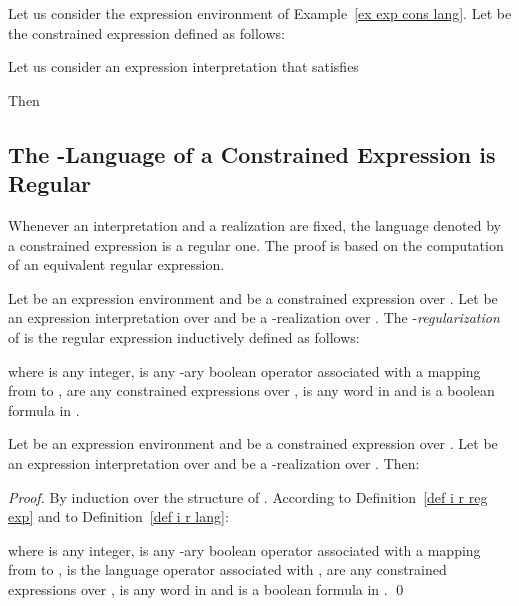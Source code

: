 \documentclass[a4paper]{llncs}
\begin{document}
    \begin{example}\label{ex anbncn}
      Let us consider the expression environment  of Example~\ref{ex exp cons lang}.
      Let  be the constrained expression defined as follows:
      
      Let us consider an expression interpretation  that satisfies
      
      Then
      
    \end{example}

  \subsection{The -Language of a Constrained Expression is Regular}
  
  Whenever an interpretation and a realization are fixed, the language denoted by a constrained expression is a regular one. The proof is based on the computation of an equivalent regular expression.
  
  \begin{definition}[Regularization]\label{def i r reg exp}
    Let  be an expression environment and  be a constrained expression over . Let  be an expression interpretation over  and  be a -realization over . The -\emph{regularization} of  is the regular expression  inductively defined as follows:
    
    where  is any integer,  is any -ary boolean operator associated with a mapping from  to ,  are any  constrained expressions over ,  is any word in  and  is a boolean formula in .  
  \end{definition}
  
  \begin{proposition}
    Let  be an expression environment and  be a constrained expression over . Let  be an expression interpretation over  and  be a -realization over . Then:
    
  \end{proposition}
  \begin{proof}
    By induction over the structure of . According to Definition~\ref{def i r reg exp} and to Definition~\ref{def i r lang}:
    
    where  is any integer,  is any -ary boolean operator associated with a mapping from  to ,  is the language operator associated with ,  are any  constrained expressions over ,  is any word in  and  is a boolean formula in .
    \qed
  \end{proof}
  
\end{document}

